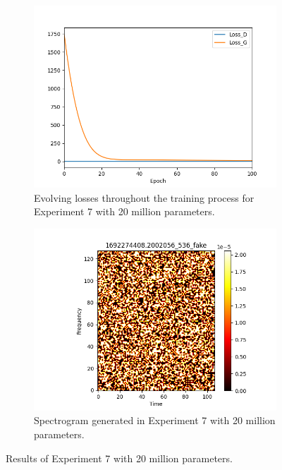\begin{figure}[!ht]
    \centering
    \begin{subfigure}{0.45\textwidth}
        \includegraphics[width=\textwidth]{figures/4.5-results/exp7_10_loss.png}
        \caption{Evolving losses throughout the training process for Experiment 7 with 20 million parameters.}
        \label{fig:exp7_10_loss}
    \end{subfigure}
    \begin{subfigure}{0.45\textwidth}
        \includegraphics[width=\textwidth]{figures/4.5-results/exp7_10_spectrogram.png}
        \caption{Spectrogram generated in Experiment 7 with 20 million parameters.}
        \label{fig:exp7_10_spectrogram}
    \end{subfigure}
    \caption{Results of Experiment 7 with 20 million parameters.}
    \label{fig:exp7_10_results}
\end{figure}


